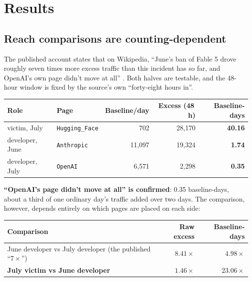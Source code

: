 \documentclass[11pt,a4paper]{article}
\begin{document}
\section{Results}

\subsection{Reach comparisons are counting-dependent}
\label{sec:counting}

The published account states that on Wikipedia, ``June's ban of Fable 5 drove
roughly seven times more excess traffic than this incident has so far, and
OpenAI's own page didn't move at all'' \cite{segerie2026warningshot}. Both
halves are testable, and the 48-hour window is fixed by the source's own
``forty-eight hours in''.

\begin{center}
\small
\begin{tabular}{llrrr}
\toprule
Role & Page & Baseline/day & Excess (48\,h) & \textbf{Baseline-days} \\\midrule
victim, July      & \texttt{Hugging\_Face} &    702 & 28{,}170 & \textbf{40.16} \\
developer, June   & \texttt{Anthropic}     & 11{,}097 & 19{,}324 & \textbf{1.74} \\
developer, July   & \texttt{OpenAI}        &  6{,}571 &  2{,}298 & \textbf{0.35} \\
\bottomrule
\end{tabular}
\end{center}

\noindent \textbf{``OpenAI's page didn't move at all'' is confirmed}: 0.35
baseline-days, about a third of one ordinary day's traffic added over two days.
The comparison, however, depends entirely on which pages are placed on each
side:

\begin{center}
\small
\begin{tabular}{lrr}
\toprule
Comparison & Raw excess & \textbf{Baseline-days} \\\midrule
June developer vs July developer (the published ``$7\times$'') & $8.41\times$ & $4.98\times$ \\
\textbf{July victim vs June developer} & $1.46\times$ & $\mathbf{23.06\times}$ \\
\bottomrule
\end{tabular}
\end{center}
\end{document}
